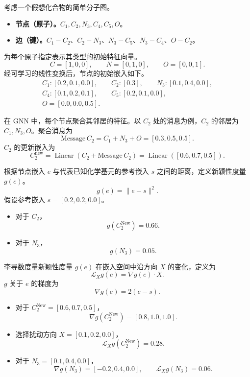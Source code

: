 考虑一个假想化合物的简单分子图。
\begin{center}
\end{center}
\begin{itemize}
  \item \textbf{节点（原子）。}$C_1,C_2,N_3,C_4,C_5,O$。
  \item \textbf{边（键）。}$C_1-C_2$、$C_2-N_3$、$N_3-C_5$、$N_3-C_4$、$O-C_2$。
\end{itemize}

为每个原子指定表示其类型的初始特征向量。
\[
  C=[1,0,0],\qquad N=[0,1,0],\qquad O=[0,0,1].
\]
经可学习的线性变换后，节点的初始嵌入如下。
\[
  \begin{gathered}
    C_1:[0.2,0.1,0.0],\qquad C_2:[0.3],\qquad N_3:[0.1,0.4,0.0],\\
    C_4:[0.1,0.2,0.1],\qquad C_5:[0.2,0.1,0.0],\\
    O=[0.0,0.0,0.5].
  \end{gathered}
\]

在 GNN 中，每个节点聚合其邻居的特征。以 $C_2$ 处的消息为例，$C_2$ 的邻居为 $C_1,N_3,O$。聚合消息为
\[
  \mathrm{Message}\,C_2=C_1+N_3+O=[0.3,0.5,0.5].
\]
$C_2$ 的更新嵌入为
\[
  C_2^{\mathrm{new}}
   =\operatorname{Linear}(C_2+\mathrm{Message}\,C_2)
   =\operatorname{Linear}([0.6,0.7,0.5]).
\]

根据节点嵌入 $e$ 与代表已知化学基元的参考嵌入 $s$ 之间的距离，定义新颖性度量 $g(e)$。
\[
  g(e)=\lVert e-s\rVert^2.
\]
假设参考嵌入 $s=[0.2,0.2,0.0]$。
\begin{itemize}
  \item 对于 $C_2$，
  \[
    g(C_2^{\mathrm{New}})=0.66.
  \]
  \item 对于 $N_3$，
  \[
    g(N_3)=0.05.
  \]
\end{itemize}

李导数度量新颖性度量 $g(e)$ 在嵌入空间中沿方向 $X$ 的变化，定义为
\[
  \mathcal L_Xg(e)=\nabla g(e)\cdot X.
\]
$g$ 关于 $e$ 的梯度为
\[
  \nabla g(e)=2(e-s).
\]
\begin{itemize}
  \item 对于 $C_2^{\mathrm{New}}=[0.6,0.7,0.5]$，
  \[
    \nabla g(C_2^{\mathrm{New}})=[0.8,1.0,1.0].
  \]
  \item 选择扰动方向 $X=[0.1,0.2,0.0]$，
  \[
    \mathcal L_Xg(C_2^{\mathrm{New}})=0.28.
  \]
  \item 对于 $N_3=[0.1,0.4,0.0]$，
  \[
    \nabla g(N_3)=[-0.2,0.4,0.0],\qquad\mathcal L_Xg(N_3)=0.06.
  \]
\end{itemize}

